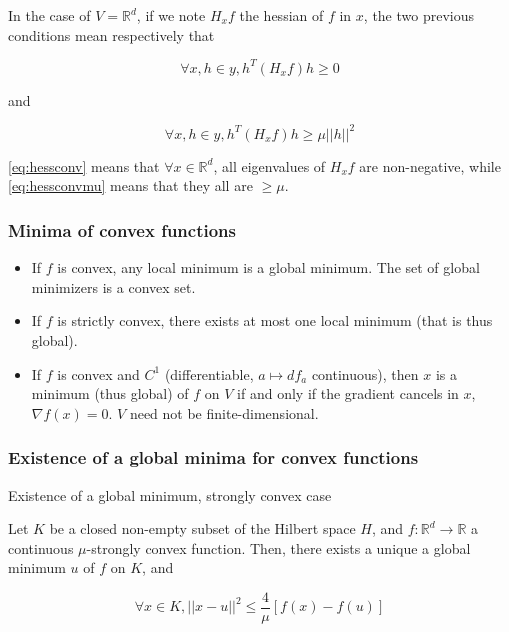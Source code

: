 \documentclass[
10pt, %
a4paper, %
oneside, %
headinclude,footinclude, %
BCOR5mm, %
]{scrartcl}
\begin{document}
\begin{remark}
    In the case of $V= \mathbb{R}^d$, if we note $H_xf$ the hessian of $f$ in $x$, the two previous conditions mean respectively that 

	    \begin{equation}
		\label{eq:hessconv}
		\forall x, h\in y, h^T(H_xf)h\geq 0
	    \end{equation}

	    and

	    \begin{equation}
		\label{eq:hessconvmu}
		\forall x, h\in y, h^T(H_xf)h\geq \mu ||h||^2
	    \end{equation}

	    \ref{eq:hessconv} means that $\forall x\in \mathbb{R}^d$, all eigenvalues of $H_xf$ are non-negative, while \ref{eq:hessconvmu} means that they all are $\geq \mu$.



\end{remark}

\subsubsection{\large\color{Periwinkle}Minima of convex functions}

\begin{proposition}
    \label{prop:miniconv}

    \begin{itemize}
        \item If $f$ is convex, any local minimum is a global minimum. The set of global minimizers is a convex set.
	\item If $f$ is strictly convex, there exists at most one local minimum (that is thus global).
	\item If $f$ is convex and $C^1$ (differentiable, $a\mapsto df_a$ continuous), then $x$ is a minimum (thus global) of $f$ on $V$ if and only if the gradient cancels in $x$, $\nabla f(x)=0$. $V$ need not be finite-dimensional.
    \end{itemize}
\end{proposition}

\subsubsection{\large\color{Periwinkle}Existence of a global minima for convex functions}

\begin{theorem}{Existence of a global minimum, strongly convex case}
    \label{th:alphaconv}

    Let $K$ be a closed non-empty subset of the Hilbert space $H$, and $f: \mathbb{R}^d\rightarrow \mathbb{R} $ a continuous $\mu$-strongly convex function. Then, there exists a unique a global minimum $u$ of $f$ on $K$, and

    \begin{equation}
	\forall x\in K, ||x-u||^2\leq \frac{4}{\mu} [ f(x)-f(u)]
    \end{equation}
\end{theorem}
\end{document}
